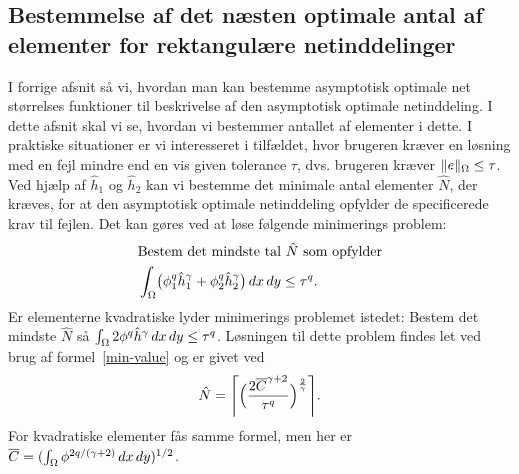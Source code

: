 \subsection{Bestemmelse af det næsten optimale antal af elementer for
rektangulære netinddelinger} \label{noae}
I forrige afsnit så vi, hvordan man kan bestemme asymptotisk optimale
net størrelses funktioner til beskrivelse af den
asymptotisk optimale netinddeling. I dette afsnit skal vi se, hvordan
vi bestemmer antallet af elementer i dette. I
praktiske situationer er vi interesseret i tilfældet, hvor brugeren
kræver en løsning med en fejl mindre end en vis given tolerance
$\tau$, dvs. brugeren kræver $\|e\|_{\Omega}\leq\tau$. Ved hjælp af
$\hat{h}_1$ og $\hat{h}_2$ kan vi bestemme det minimale antal
elementer $\hat{N}$, der kræves, for at den asymptotisk optimale
netinddeling opfylder de specificerede krav til fejlen. Det kan gøres
ved at løse følgende minimerings problem:  
\begin{align} \label{cononN}
  &\text{Bestem det mindste tal $\hat{N}$ som opfylder} \\
  &\int_{\Omega} \bigl( \phi_1^q \hat{h}_1^\gamma + \phi_2^q \hat{h}_2^\gamma 
    \bigr)\, dx\, dy \leq \tau^q. \notag
\end{align}
Er elementerne kvadratiske lyder minimerings problemet istedet: Bestem
det mindste $\hat{N}$ så $\int_{\Omega} 2\phi^q\hat{h}^\gamma
\, dx\, dy \leq\tau^q$.
Løsningen til dette problem findes let ved brug af
formel~\eqref{min-value} og er givet ved 
\begin{equation} \label{valueofN}
  \hat{N} = \Biggl\lceil \Bigl( \frac{2\overline{C}^{\gamma +2}}{\tau^q}
  \Bigr)^{\frac{2}{\gamma}} \Biggr\rceil .   
\end{equation}
For kvadratiske elementer fås samme formel, men her er 
$\overline{C}=( \int_{\Omega} \phi^{2q/(\gamma +2)}\, dx\, dy )^{1/2}$.

